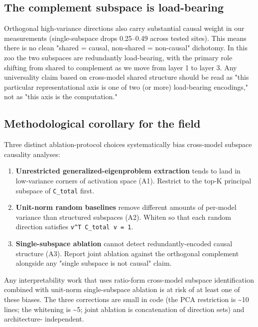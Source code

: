 \subsection{The complement subspace is load-bearing}

Orthogonal high-variance directions also carry substantial causal weight
in our measurements (single-subspace drops 0.25--0.49 across tested
sites). This means there is no clean "shared = causal,
non-shared = non-causal" dichotomy. In this zoo the two subspaces are
redundantly load-bearing, with the primary role shifting from shared to
complement as we move from layer 1 to layer 3. Any universality claim
based on cross-model shared structure should be read as "this particular
representational axis is one of two (or more) load-bearing encodings,"
not as "this axis is the computation."

\subsection{Methodological corollary for the field}

Three distinct ablation-protocol choices systematically bias
cross-model subspace causality analyses:

\begin{enumerate}
  \item \textbf{Unrestricted generalized-eigenproblem extraction} tends to land in low-variance corners of activation space (A1). Restrict to the top-K principal subspace of \texttt{C\_total} first.
  \item \textbf{Unit-norm random baselines} remove different amounts of per-model variance than structured subspaces (A2). Whiten so that each random direction satisfies \texttt{v\textasciicircum{}T C\_total v = 1}.
  \item \textbf{Single-subspace ablation} cannot detect redundantly-encoded causal structure (A3). Report joint ablation against the orthogonal complement alongside any "single subspace is not causal" claim.
\end{enumerate}

Any interpretability work that uses ratio-form cross-model subspace
identification combined with unit-norm single-subspace ablation is at
risk of at least one of these biases. The three corrections are small
in code (the PCA restriction is \textasciitilde{}10 lines; the whitening is \textasciitilde{}5; joint
ablation is concatenation of direction sets) and architecture-
independent.

